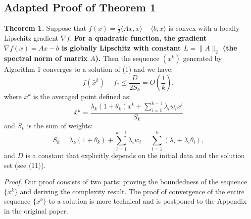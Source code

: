 \documentclass{article}
\begin{document}
\subsection*{Adapted Proof of Theorem 1}

\textbf{Theorem 1.} Suppose that $f(x) = \frac{1}{2} \langle Ax, x \rangle - \langle b, x \rangle$ is convex with a locally Lipschitz gradient $\nabla f$. \textbf{For a quadratic function, the gradient $\nabla f(x) = Ax - b$ is globally Lipschitz with constant $L = \|A\|_2$ (the spectral norm of matrix $A$).} Then the sequence $(x^k)$ generated by Algorithm 1 converges to a solution of (1) and we have:
$$ f(\bar{x}^k) - f_* \leq \frac{D}{2S_k} = O(\frac{1}{k}), $$
where $\bar{x}^k$ is the averaged point defined as:
$$ \bar{x}^k = \frac{\lambda_k(1+\theta_k)x^k + \sum_{i=1}^{k-1} \lambda_i w_i x^i}{S_k} $$
and $S_k$ is the sum of weights:
$$ S_k = \lambda_k(1+\theta_k) + \sum_{i=1}^{k-1} \lambda_i w_i = \sum_{i=1}^k (\lambda_i + \lambda_i \theta_i), $$
and $D$ is a constant that explicitly depends on the initial data and the solution set (see (11)).

\textit{Proof.} Our proof consists of two parts: proving the boundedness of the sequence $\{x^k\}$ and deriving the complexity result. The proof of convergence of the entire sequence $\{x^k\}$ to a solution is more technical and is postponed to the Appendix in the original paper.
\end{document}
